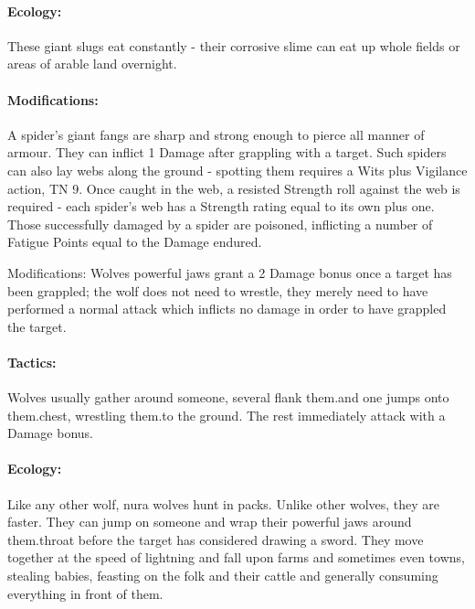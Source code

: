 \paragraph{Ecology:} These giant slugs eat constantly - their corrosive slime can eat up whole fields or areas of arable land overnight.

\label{nura_spider}

\nuraspider

\paragraph{Modifications:} A spider's giant fangs are sharp and strong enough to pierce all manner of armour.  They can inflict 1 Damage after grappling with a target.  Such spiders can also lay webs along the ground - spotting them requires a Wits plus Vigilance action, TN 9.  Once caught in the web, a resisted Strength roll against the web is required - each spider's web has a Strength rating equal to its own plus one.  Those successfully damaged by a spider are poisoned, inflicting a number of Fatigue Points equal to the Damage endured.

\label{nura_wolf}

\nurawolf

Modifications: Wolves powerful jaws grant a 2 Damage bonus once a target has been grappled; the wolf does not need to wrestle, they merely need to have performed a normal attack which inflicts no damage in order to have grappled the target.

\paragraph{Tactics:} Wolves usually gather around someone, several flank them.and one jumps onto them.chest, wrestling them.to the ground.  The rest immediately attack with a Damage bonus.

\paragraph{Ecology:} Like any other wolf, nura wolves hunt in packs.  Unlike other wolves, they are faster.  They can jump on someone and wrap their powerful jaws around them.throat before the target has considered drawing a sword.  They move together at the speed of lightning and fall upon farms and sometimes even towns, stealing babies, feasting on the folk and their cattle and generally consuming everything in front of them.

